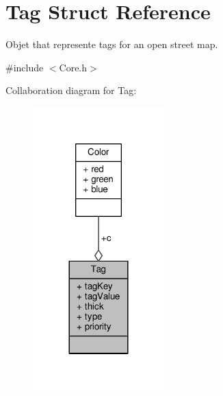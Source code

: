 \hypertarget{structTag}{\section{Tag Struct Reference}
\label{structTag}
}


Objet that represente tags for an open street map.  




{\ttfamily \#include $<$Core.\-h$>$}



Collaboration diagram for Tag\-:
\nopagebreak
\begin{figure}[H]
\begin{center}
\leavevmode
\includegraphics[width=144pt]{structTag__coll__graph}
\end{center}
\end{figure}
